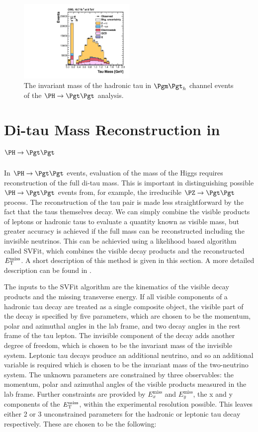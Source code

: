 \begin{figure}
\begin{center}
    \includegraphics[width=0.5\textwidth]
      {plots/reco/m_2_inclusive_mt_2012.pdf}
\end{center}
\caption{The invariant mass of the hadronic tau in $\mutau$ channel events of
the $\PH\to\Pgt\Pgt$ analysis.}
\label{fig:taumass}
\end{figure}

\section{Di-tau Mass Reconstruction in $\PH \to \Pgt\Pgt$}
\label{sec:svfit}

In $\PH \to \Pgt\Pgt$ events, evaluation of the mass of the Higgs requires reconstruction of the 
full di-tau mass. This is important in distinguishing possible $\PH\to\Pgt\Pgt$
events from, for example, the irreducible $\PZ \to \Pgt\Pgt$ process. 
The reconstruction of the tau pair is made less straightforward
by the fact that the taus themselves decay. We can simply combine the visible
products of leptons or hadronic taus to evaluate a quantity known as visible mass,
but greater accuracy is achieved if the full mass can be reconstructed including the
invisible neutrinos. This can be achievied using a likelihood based algorithm called
SVFit, which combines the visible decay products and the reconstructed $E_{\mathrm{T}}^{\text{miss}}$. A
short description of this method is given in this section. A more detailed
description can be found in \cite{HIG-13-004}.

The inputs to the SVFit algorithm are the kinematics of the visible decay
products and the missing transverse energy. If all visible components of a
hadronic tau decay are treated as a single composite object, the visible part of
the decay is specified by five parameters, which are chosen to be the momentum,
polar and azimuthal angles in the lab frame, and two decay angles in the rest
frame of the tau lepton. The invisible component of the decay adds another
degree of freedom, which is chosen to be the invariant mass of the invisible
system. Leptonic tau decays produce an additional neutrino, and so an additional
variable is required which is chosen to be the invariant mass of the
two-neutrino system. The unknown parameters are constrained by three
observables: the momentum, polar and azimuthal angles of the visible products
measured in the lab frame. Further constraints are provided by
$E_{x}^{\text{miss}}$ and $E_{y}^{\text{miss}}$, the x and y components of the
$E_{\mathrm{T}}^{\text{miss}}$, within the experimental resolution possible. This leaves either 2 or 3 
unconstrained parameters for the hadronic or leptonic tau decay respectively. 
These are chosen to be the following:

